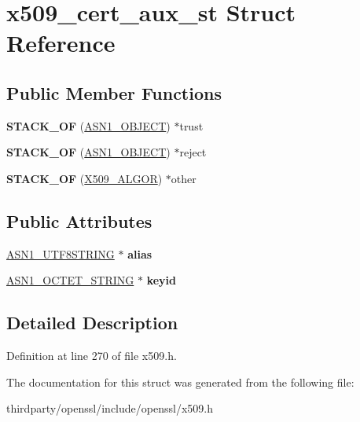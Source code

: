 \hypertarget{structx509__cert__aux__st}{}\section{x509\+\_\+cert\+\_\+aux\+\_\+st Struct Reference}
\label{structx509__cert__aux__st}
\subsection*{Public Member Functions}
\begin{DoxyCompactItemize}
\item 
\mbox{\label{structx509__cert__aux__st_a5722dd9d276e0231b70b66d6aa7b26a2}} 
{\bfseries S\+T\+A\+C\+K\+\_\+\+OF} (\hyperlink{structasn1__object__st}{A\+S\+N1\+\_\+\+O\+B\+J\+E\+CT}) $\ast$trust
\item 
\mbox{\label{structx509__cert__aux__st_a45425310f50ad0ca0c2fc0a6ab7cd600}} 
{\bfseries S\+T\+A\+C\+K\+\_\+\+OF} (\hyperlink{structasn1__object__st}{A\+S\+N1\+\_\+\+O\+B\+J\+E\+CT}) $\ast$reject
\item 
\mbox{\label{structx509__cert__aux__st_abb54f8042a8a28a43258abf811bdc2d6}} 
{\bfseries S\+T\+A\+C\+K\+\_\+\+OF} (\hyperlink{struct_x509__algor__st}{X509\+\_\+\+A\+L\+G\+OR}) $\ast$other
\end{DoxyCompactItemize}
\subsection*{Public Attributes}
\begin{DoxyCompactItemize}
\item 
\mbox{\label{structx509__cert__aux__st_a1a7eaa5e4a497f4b697d4709e5117d5b}} 
\hyperlink{structasn1__string__st}{A\+S\+N1\+\_\+\+U\+T\+F8\+S\+T\+R\+I\+NG} $\ast$ {\bfseries alias}
\item 
\mbox{\label{structx509__cert__aux__st_a6f0743e8b9131e4502d55ca83d278801}} 
\hyperlink{structasn1__string__st}{A\+S\+N1\+\_\+\+O\+C\+T\+E\+T\+\_\+\+S\+T\+R\+I\+NG} $\ast$ {\bfseries keyid}
\end{DoxyCompactItemize}


\subsection{Detailed Description}


Definition at line 270 of file x509.\+h.



The documentation for this struct was generated from the following file\+:\begin{DoxyCompactItemize}
\item 
thirdparty/openssl/include/openssl/x509.\+h\end{DoxyCompactItemize}
